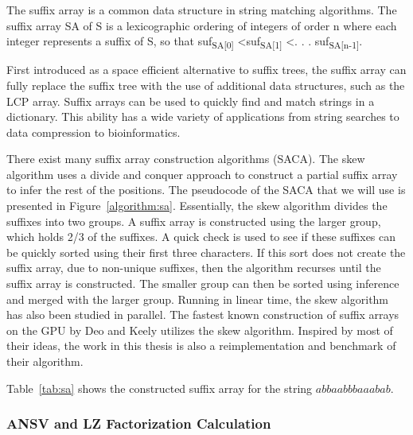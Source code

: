 The suffix array is a common data structure in string matching algorithms.
The suffix array SA of S is a lexicographic ordering of integers of order n where each integer represents a suffix of S, so that suf\textsubscript{SA[0]} \textless suf\textsubscript{SA[1]} \textless . . . suf\textsubscript{SA[n-1]}.

First introduced as a space efficient alternative to suffix trees, the suffix array can fully replace the suffix tree with the use of additional data structures, such as the LCP array.
Suffix arrays can be used to quickly find and match strings in a dictionary.
This ability has a wide variety of applications from string searches to data compression to bioinformatics.

There exist many suffix array construction algorithms (SACA).
The skew algorithm \cite{karkkainen2003simple} uses a divide and conquer approach to construct a partial suffix array to infer the rest of the positions.
The pseudocode of the SACA that we will use is presented in Figure~\ref{algorithm:sa}.
Essentially, the skew algorithm divides the suffixes into two groups.
A suffix array is constructed using the larger group, which holds 2/3 of the suffixes.
A quick check is used to see if these suffixes can be quickly sorted using their first three characters.
If this sort does not create the suffix array, due to non-unique suffixes, then the algorithm recurses until the suffix array is constructed.
The smaller group can then be sorted using inference and merged with the larger group.
Running in linear time, the skew algorithm has also been studied in parallel.
The fastest known construction of suffix arrays on the GPU by Deo and Keely \cite{Deo} utilizes the skew algorithm.
Inspired by most of their ideas, the work in this thesis is also a reimplementation and benchmark of their algorithm.

Table~\ref{tab:sa} shows the constructed suffix array for the string $abbaabbbaaabab$.


\subsubsection{ANSV and LZ Factorization Calculation}

